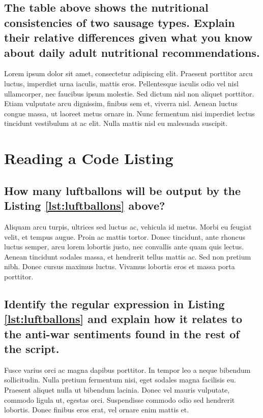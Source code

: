 \documentclass[11pt]{scrartcl} %
\begin{document}

\subsection{The table above shows the nutritional consistencies of two sausage types. Explain their relative differences given what you know about daily adult nutritional recommendations.}

Lorem ipsum dolor sit amet, consectetur adipiscing elit. Praesent porttitor arcu luctus, imperdiet urna iaculis, mattis eros. Pellentesque iaculis odio vel nisl ullamcorper, nec faucibus ipsum molestie. Sed dictum nisl non aliquet porttitor. Etiam vulputate arcu dignissim, finibus sem et, viverra nisl. Aenean luctus congue massa, ut laoreet metus ornare in. Nunc fermentum nisi imperdiet lectus tincidunt vestibulum at ac elit. Nulla mattis nisl eu malesuada suscipit.


\section{Reading a Code Listing}




\subsection{How many luftballons will be output by the Listing \ref{lst:luftballons} above?}

Aliquam arcu turpis, ultrices sed luctus ac, vehicula id metus. Morbi eu feugiat velit, et tempus augue. Proin ac mattis tortor. Donec tincidunt, ante rhoncus luctus semper, arcu lorem lobortis justo, nec convallis ante quam quis lectus. Aenean tincidunt sodales massa, et hendrerit tellus mattis ac. Sed non pretium nibh. Donec cursus maximus luctus. Vivamus lobortis eros et massa porta porttitor.


\subsection{Identify the regular expression in Listing \ref{lst:luftballons} and explain how it relates to the anti-war sentiments found in the rest of the script.}

Fusce varius orci ac magna dapibus porttitor. In tempor leo a neque bibendum sollicitudin. Nulla pretium fermentum nisi, eget sodales magna facilisis eu. Praesent aliquet nulla ut bibendum lacinia. Donec vel mauris vulputate, commodo ligula ut, egestas orci. Suspendisse commodo odio sed hendrerit lobortis. Donec finibus eros erat, vel ornare enim mattis et.

\end{document}
